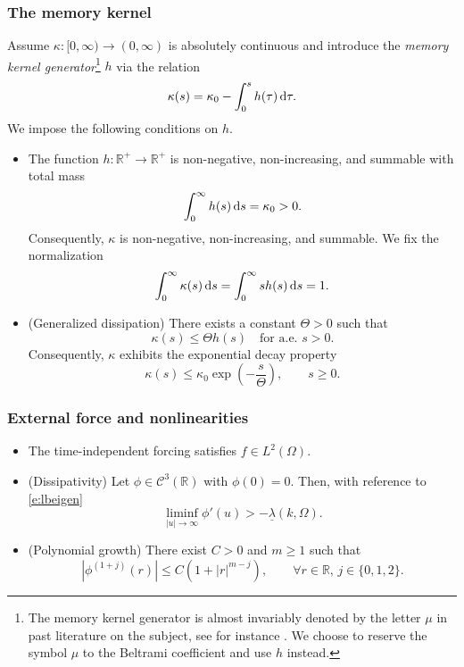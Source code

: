 \documentclass[12pt,leqno]{amsart}
\def\d{{\rm d}}
\theoremstyle{definition}
\numberwithin{equation}{section}
\numberwithin{figure}{section}
\begin{document}
\subsubsection*{The memory kernel}
  Assume $\kappa:[0,\infty) \to (0,\infty)$ is absolutely continuous and introduce the \emph{memory kernel generator}\footnote{The memory kernel generator is almost invariably denoted by the letter $\mu$ in past literature on the subject, see for instance \cites{CGDP2010,AMN}. We choose to reserve the symbol $\mu$ to the Beltrami coefficient and use $h$ instead.} $h$ via the relation
\[
\kappa(s) = \kappa_0 - \int_0^s h(\tau) \, \d \tau.
\]
We impose the following conditions on $h$.
\begin{itemize}

\item[(K1)] The function $h: \mathbb{R}^+ \to \mathbb{R}^+$ is non-negative, non-increasing, and summable with total mass
\[
\int_0^\infty h(s) \, \d s = \kappa_0 > 0.
\]
Consequently, $\kappa$ is non-negative, non-increasing, and summable. We fix the normalization
\begin{equation}
	\label{e:kappanorm}
\int_0^\infty \kappa(s) \, \d s = \int_0^\infty s h(s) \, \d s = 1.
\end{equation}
\item[(K2)] (Generalized dissipation) There exists a constant $\Theta > 0$ such that
\[
\kappa(s) \le \Theta h(s) \quad \text{for a.e. } s > 0.
\]
Consequently, $\kappa $ exhibits the exponential decay property
\[
\kappa(s) \leq \kappa_0 \exp\left({-\frac{s}{\Theta}}\right), \qquad s\geq 0.
\]
\end{itemize}
\subsubsection*{External force and nonlinearities}
\begin{itemize}
\item[(F)] The time-independent forcing satisfies $f \in L^2(\Omega)$.
\item[(P1)] (Dissipativity) Let $\phi \in \mathcal{C}^3(\mathbb{R})$ with $\phi(0) =0$. Then, with reference to \eqref{e:lbeigen}
\[
\liminf_{|u| \to \infty } \phi'(u) > -\underline{\lambda}(k,\Omega).
\]
\item[(P2)] (Polynomial growth) There exist $C > 0$ and $m \ge 1$ such that
\[
\left|\phi^{(1+j)}(r)\right| \le C(1+|r|^{m-j}), \qquad \forall r \in \mathbb{R},\, j \in \{0,1,2\}.
\]
\end{itemize}
\end{document}

